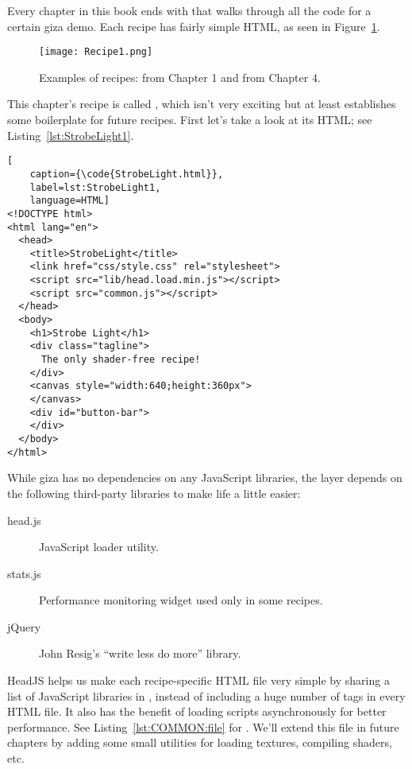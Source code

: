 
Every chapter in this book ends with  that walks through all the code for a certain giza demo.  Each recipe has fairly simple HTML, as seen in Figure~\ref{fig:Recipe1}.

\begin{figure}[htb]\centering
  \texttt{[image: Recipe1.png]}
  \caption{Examples of recipes:  from Chapter 1 and  from Chapter 4.}
  \label{fig:Recipe1}
\end{figure}

This chapter's recipe is called , which isn't very exciting but at least establishes some boilerplate for future recipes.  First let's take a look at its HTML; see Listing~\ref{lst:StrobeLight1}.

\begin{lstlisting}[
    caption={\code{StrobeLight.html}},
    label=lst:StrobeLight1,
    language=HTML]
<!DOCTYPE html>
<html lang="en">
  <head>
    <title>StrobeLight</title>
    <link href="css/style.css" rel="stylesheet">
    <script src="lib/head.load.min.js"></script>
    <script src="common.js"></script>
  </head>
  <body>
    <h1>Strobe Light</h1>
    <div class="tagline">
      The only shader-free recipe!
    </div>
    <canvas style="width:640;height:360px">
    </canvas>
    <div id="button-bar">
    </div>
  </body>
</html>
\end{lstlisting} 

While giza has no dependencies on any JavaScript libraries, the  layer depends on the following third-party libraries to make life a little easier:

\begin{description}
\item[head.js] JavaScript loader utility.
\item[stats.js] Performance monitoring widget used only in some recipes.
\item[jQuery] John Resig's ``write less do more'' library.
\end{description}

HeadJS helps us make each recipe-specific HTML file very simple by sharing a list of JavaScript libraries in , instead of including a huge number of  tags in every HTML file.  It also has the benefit of loading scripts asynchronously for better performance.  See Listing~\ref{lst:COMMON:file} for .  We'll extend this file in future chapters by adding some small utilities for loading textures, compiling shaders, etc.

